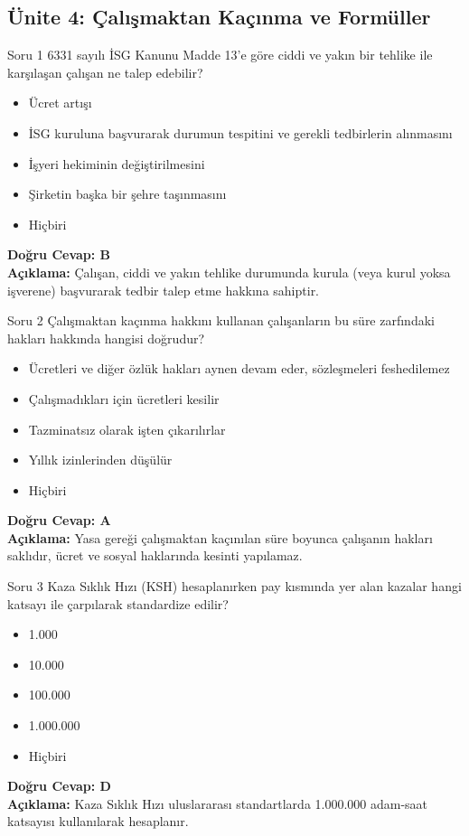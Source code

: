 \documentclass[12pt,a4paper]{article}
\begin{document}
\subsection{Ünite 4: Çalışmaktan Kaçınma ve Formüller}
\begin{testcard}{Soru 1}
    6331 sayılı İSG Kanunu Madde 13'e göre ciddi ve yakın bir tehlike ile karşılaşan çalışan ne talep edebilir?
    \begin{itemize}
        \item[A)] Ücret artışı
        \item[B)] İSG kuruluna başvurarak durumun tespitini ve gerekli tedbirlerin alınmasını
        \item[C)] İşyeri hekiminin değiştirilmesini
        \item[D)] Şirketin başka bir şehre taşınmasını
        \item[E)] Hiçbiri
    \end{itemize}
    \tcblower
    \textbf{Doğru Cevap: B} \\
    \textbf{Açıklama:} Çalışan, ciddi ve yakın tehlike durumunda kurula (veya kurul yoksa işverene) başvurarak tedbir talep etme hakkına sahiptir.
\end{testcard}

\begin{testcard}{Soru 2}
    Çalışmaktan kaçınma hakkını kullanan çalışanların bu süre zarfındaki hakları hakkında hangisi doğrudur?
    \begin{itemize}
        \item[A)] Ücretleri ve diğer özlük hakları aynen devam eder, sözleşmeleri feshedilemez
        \item[B)] Çalışmadıkları için ücretleri kesilir
        \item[C)] Tazminatsız olarak işten çıkarılırlar
        \item[D)] Yıllık izinlerinden düşülür
        \item[E)] Hiçbiri
    \end{itemize}
    \tcblower
    \textbf{Doğru Cevap: A} \\
    \textbf{Açıklama:} Yasa gereği çalışmaktan kaçınılan süre boyunca çalışanın hakları saklıdır, ücret ve sosyal haklarında kesinti yapılamaz.
\end{testcard}

\begin{testcard}{Soru 3}
    Kaza Sıklık Hızı (KSH) hesaplanırken pay kısmında yer alan kazalar hangi katsayı ile çarpılarak standardize edilir?
    \begin{itemize}
        \item[A)] 1.000
        \item[B)] 10.000
        \item[C)] 100.000
        \item[D)] 1.000.000
        \item[E)] Hiçbiri
    \end{itemize}
    \tcblower
    \textbf{Doğru Cevap: D} \\
    \textbf{Açıklama:} Kaza Sıklık Hızı uluslararası standartlarda 1.000.000 adam-saat katsayısı kullanılarak hesaplanır.
\end{testcard}
\end{document}
